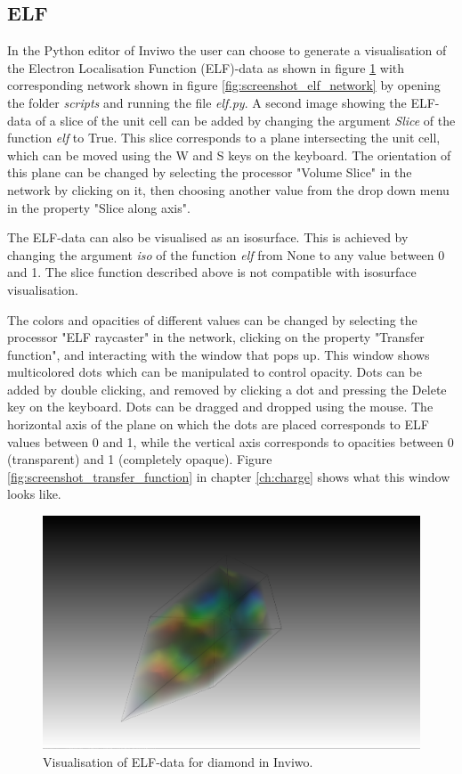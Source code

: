 \documentclass[a4paper,12pt]{article}
\begin{document}
\subsection{ELF}
In the Python editor of Inviwo the user can choose to generate a visualisation of the Electron Localisation Function (ELF)-data as shown in figure \ref{fig:screenshot_elf} with corresponding network shown in figure \ref{fig:screenshot_elf_network} by opening the folder \textit{scripts} and running the file \textit{elf.py}. A second image showing the ELF-data of a slice of the unit cell can be added by changing the argument \textit{Slice} of the function \textit{elf} to True. This slice corresponds to a plane intersecting the unit cell, which can be moved using the W and S keys on the keyboard. The orientation of this plane can be changed by selecting the processor "Volume Slice" in the network by clicking on it, then choosing another value from the drop down menu in the property "Slice along axis".

The ELF-data can also be visualised as an isosurface. This is achieved by changing the argument \textit{iso} of the function \textit{elf} from None to any value between 0 and 1. The slice function described above is not compatible with isosurface visualisation.

The colors and opacities of different values can be changed by selecting the processor "ELF raycaster" in the network, clicking on the property "Transfer function", and interacting with the window that pops up. This window shows multicolored dots which can be manipulated to control opacity. Dots can be added by double clicking, and removed by clicking a dot and pressing the Delete key on the keyboard. Dots can be dragged and dropped using the mouse. The horizontal axis of the plane on which the dots are placed corresponds to ELF values between 0 and 1, while the vertical axis corresponds to opacities between 0 (transparent) and 1 (completely opaque). Figure \ref{fig:screenshot_transfer_function} in chapter \ref{ch:charge} shows what this window looks like.
\begin{figure} [H]
\centering
\includegraphics[scale = 0.20]{screenshot_elf_diamant.png}
\caption{Visualisation of ELF-data for diamond in Inviwo.}
\label{fig:screenshot_elf}
\end{figure}
\end{document}
